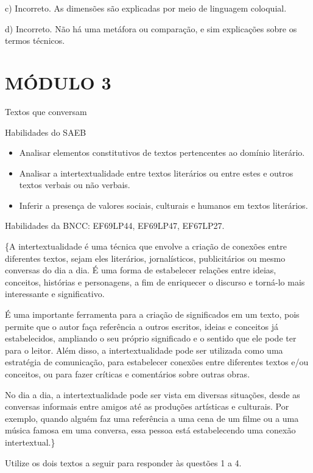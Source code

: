 {c) Incorreto. As dimensões são explicadas por meio de linguagem
coloquial.

d) Incorreto. Não há uma metáfora ou comparação, e sim explicações sobre
os termos técnicos.

\section{MÓDULO 3}

Textos que conversam

Habilidades do SAEB

\begin{itemize}
\tightlist
\item
  Analisar elementos constitutivos de textos pertencentes ao domínio
  literário.
\item
  Analisar a intertextualidade entre textos literários ou entre estes e
  outros textos verbais ou não verbais.
\item
  Inferir a presença de valores sociais, culturais e humanos em textos
  literários.
\end{itemize}

Habilidades da BNCC: EF69LP44, EF69LP47, EF67LP27.


\{A intertextualidade é uma técnica que envolve a criação de conexões
entre diferentes textos, sejam eles literários, jornalísticos,
publicitários ou mesmo conversas do dia a dia. É uma forma de
estabelecer relações entre ideias, conceitos, histórias e personagens, a
fim de enriquecer o discurso e torná-lo mais interessante e
significativo.

É uma importante ferramenta para a criação de significados em um texto,
pois permite que o autor faça referência a outros escritos, ideias e
conceitos já estabelecidos, ampliando o seu próprio significado e o
sentido que ele pode ter para o leitor. Além disso, a intertextualidade
pode ser utilizada como uma estratégia de comunicação, para estabelecer
conexões entre diferentes textos e/ou conceitos, ou para fazer críticas
e comentários sobre outras obras.

No dia a dia, a intertextualidade pode ser vista em diversas situações,
desde as conversas informais entre amigos até as produções artísticas e
culturais. Por exemplo, quando alguém faz uma referência a uma cena de
um filme ou a uma música famosa em uma conversa, essa pessoa está
estabelecendo uma conexão intertextual.\}

Utilize os dois textos a seguir para responder às questões 1 a 4.

}
